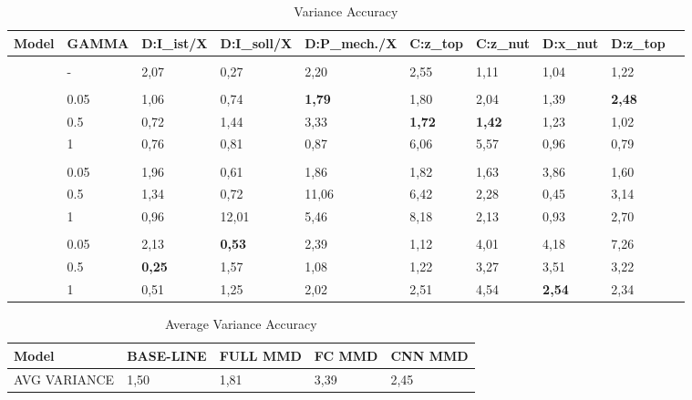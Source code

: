 \begin {table}[H]
\centering
\begin{adjustwidth}{-.5cm}{}
\begin{tabular}{llllllllll}
  \toprule
  Model          & GAMMA    & D:I\_ist/X & D:I\_soll/X & D:P\_mech./X & C:z\_top & C:z\_nut & D:x\_nut & D:z\_top  \\
  \midrule
  \parbox[t]{2mm}{} &&&&&&&&\\
                  & -      & 2,07 & 0,27 & 2,20 & 2,55 & 1,11 & 1,04 & 1,22\\
\vspace{.1cm}
 \parbox[t]{2mm}{} &&&&&&&&&\\
 
                  & 0.05   & 1,06 & 0,74 & \textbf{1,79} & 1,80 & 2,04 & 1,39 & \textbf{2,48}\\
                  & 0.5    & 0,72 & 1,44 & 3,33 & \textbf{1,72} & \textbf{1,42} & 1,23 & 1,02\\
                  & 1      & 0,76 & 0,81 & 0,87 & 6,06 & 5,57 & 0,96 & 0,79\\
\vspace{.1cm}
 \parbox[t]{2mm}{} &&&&&&&&&\\
                  & 0.05   & 1,96 & 0,61 & 1,86 & 1,82 & 1,63 & 3,86 & 1,60\\
                  & 0.5    & 1,34 & 0,72 & 11,06 & 6,42 & 2,28 & 0,45 & 3,14\\
                  & 1      & 0,96 & 12,01 & 5,46 & 8,18 & 2,13 & 0,93 & 2,70\\
\vspace{.1cm}
 \parbox[t]{2mm}{} &&&&&&&&&\\
                  & 0.05   & 2,13 & \textbf{0,53} & 2,39 & 1,12 & 4,01 & 4,18 & 7,26\\
                  & 0.5    & \textbf{0,25} & 1,57 & 1,08 & 1,22 & 3,27 & 3,51 & 3,22\\
                  & 1      & 0,51 & 1,25 & 2,02 & 2,51 & 4,54 & \textbf{2,54} & 2,34\\
  \bottomrule
\end{tabular}
\end{adjustwidth}
\caption {Variance Accuracy} \label{tab:Variance_Accuracy} 
\end {table}



\begin {table}[H]
\centering
\begin{tabular}{lllll}
  \toprule
  Model & BASE-LINE & FULL MMD & FC MMD & CNN MMD\\
  \midrule
  AVG VARIANCE & 1,50 & 1,81 & 3,39 & 2,45\\
  \bottomrule
\end{tabular}
\caption {Average Variance Accuracy} \label{tab:Average_Variance_Accuracy} 
\end {table}
